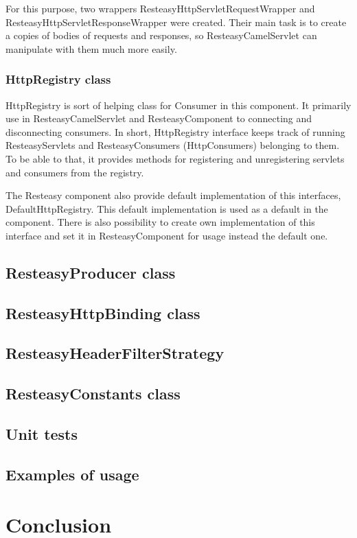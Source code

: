 \documentclass[12pt,final,oneside]{fithesis2}
\begin{document}
For this purpose, two wrappers ResteasyHttpServletRequestWrapper and ResteasyHttpServletResponseWrapper were created. Their main task is to create a copies of bodies of requests and responses, so  ResteasyCamelServlet can manipulate with them much more easily.


\subsection{HttpRegistry class}\label{registry}
HttpRegistry is sort of helping class for Consumer in this component. It primarily use in ResteasyCamelServlet and ResteasyComponent to connecting and disconnecting consumers. In short, HttpRegistry interface keeps track of running ResteasyServlets and ResteasyConsumers (HttpConsumers) belonging to them.  To be able to that, it provides methods for registering and unregistering servlets and consumers from the registry.

The Resteasy component also provide default implementation of this interfaces, DefaultHttpRegistry. This default implementation is used as a default in the component. There is also possibility to create own implementation of this interface and set it in ResteasyComponent for usage instead the default one. 


\section{ResteasyProducer class}
\section{ResteasyHttpBinding class}
\section{ResteasyHeaderFilterStrategy}
\section{ResteasyConstants class}
\section{Unit tests}
\section{Examples of usage}

\chapter{Conclusion}
\end{document}
